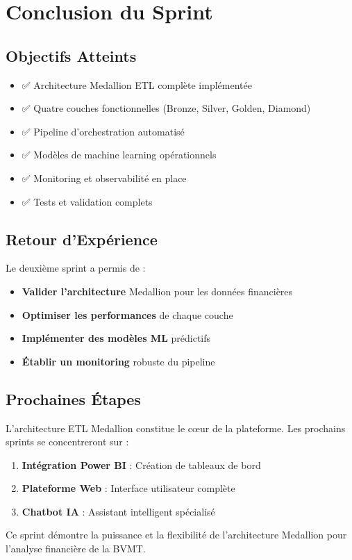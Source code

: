 \section{Conclusion du Sprint}

\subsection{Objectifs Atteints}

\begin{itemize}
    \item ✅ Architecture Medallion ETL complète implémentée
    \item ✅ Quatre couches fonctionnelles (Bronze, Silver, Golden, Diamond)
    \item ✅ Pipeline d'orchestration automatisé
    \item ✅ Modèles de machine learning opérationnels
    \item ✅ Monitoring et observabilité en place
    \item ✅ Tests et validation complets
\end{itemize}

\subsection{Retour d'Expérience}

Le deuxième sprint a permis de :

\begin{itemize}
    \item \textbf{Valider l'architecture} Medallion pour les données financières
    \item \textbf{Optimiser les performances} de chaque couche
    \item \textbf{Implémenter des modèles ML} prédictifs
    \item \textbf{Établir un monitoring} robuste du pipeline
\end{itemize}

\subsection{Prochaines Étapes}

L'architecture ETL Medallion constitue le cœur de la plateforme. Les prochains sprints se concentreront sur :

\begin{enumerate}
    \item \textbf{Intégration Power BI} : Création de tableaux de bord
    \item \textbf{Plateforme Web} : Interface utilisateur complète
    \item \textbf{Chatbot IA} : Assistant intelligent spécialisé
\end{enumerate}

Ce sprint démontre la puissance et la flexibilité de l'architecture Medallion pour l'analyse financière de la BVMT.
